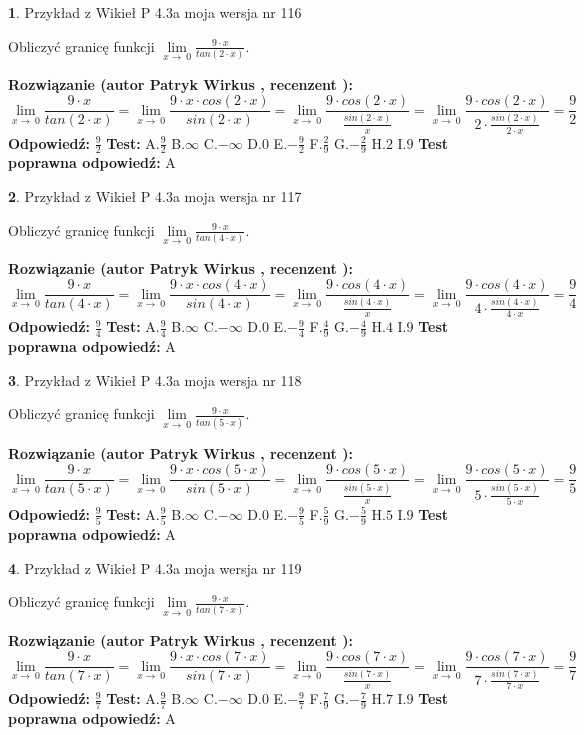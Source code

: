 \documentclass[12pt, a4paper]{article}
\theoremstyle{definition} %
\newtheorem{zad}{}
\newcommand{\zadStart}[1]{\begin{zad}#1\newline}
\newcommand{\zadStop}{\end{zad}}
\newcommand{\rozwStart}[2]{\noindent \textbf{Rozwiązanie (autor #1 , recenzent #2): }\newline}
\newcommand{\rozwStop}{\newline}
\newcommand{\odpStart}{\noindent \textbf{Odpowiedź:}\newline}
\newcommand{\odpStop}{\newline}
\newcommand{\testStart}{\noindent \textbf{Test:}\newline}
\newcommand{\testStop}{\newline}
\newcommand{\kluczStart}{\noindent \textbf{Test poprawna odpowiedź:}\newline}
\newcommand{\kluczStop}{\newline}
\begin{document}
\zadStart{Przykład z Wikieł P 4.3a moja wersja nr 116}


Obliczyć granicę funkcji $\lim\limits_{x\to\ 0}\frac{9 \cdot x}{tan(2 \cdot x)}$.
\zadStop
\rozwStart{Patryk Wirkus}{}
$$\lim\limits_{x\to\ 0}\frac{9 \cdot x}{tan(2 \cdot x)}=\lim\limits_{x\to\ 0}\frac{9 \cdot x \cdot cos(2 \cdot x)}{sin(2 \cdot x)}=\lim\limits_{x\to\ 0}\frac{9 \cdot cos(2 \cdot x)}{\frac{sin(2 \cdot x)}{x}}=\lim\limits_{x\to\ 0}\frac{9 \cdot cos(2 \cdot x)}{2 \cdot \frac{sin(2 \cdot x)}{2 \cdot x}} = \frac{9}{2}$$
\rozwStop
\odpStart
$\frac{9}{2}$
\odpStop
\testStart
A.$\frac{9}{2}$
B.$\infty$
C.$-\infty$
D.$0$
E.$-\frac{9}{2}$
F.$\frac{2}{9}$
G.$-\frac{2}{9}$
H.$2$
I.$9$
\testStop
\kluczStart
A
\kluczStop



\zadStart{Przykład z Wikieł P 4.3a moja wersja nr 117}


Obliczyć granicę funkcji $\lim\limits_{x\to\ 0}\frac{9 \cdot x}{tan(4 \cdot x)}$.
\zadStop
\rozwStart{Patryk Wirkus}{}
$$\lim\limits_{x\to\ 0}\frac{9 \cdot x}{tan(4 \cdot x)}=\lim\limits_{x\to\ 0}\frac{9 \cdot x \cdot cos(4 \cdot x)}{sin(4 \cdot x)}=\lim\limits_{x\to\ 0}\frac{9 \cdot cos(4 \cdot x)}{\frac{sin(4 \cdot x)}{x}}=\lim\limits_{x\to\ 0}\frac{9 \cdot cos(4 \cdot x)}{4 \cdot \frac{sin(4 \cdot x)}{4 \cdot x}} = \frac{9}{4}$$
\rozwStop
\odpStart
$\frac{9}{4}$
\odpStop
\testStart
A.$\frac{9}{4}$
B.$\infty$
C.$-\infty$
D.$0$
E.$-\frac{9}{4}$
F.$\frac{4}{9}$
G.$-\frac{4}{9}$
H.$4$
I.$9$
\testStop
\kluczStart
A
\kluczStop



\zadStart{Przykład z Wikieł P 4.3a moja wersja nr 118}


Obliczyć granicę funkcji $\lim\limits_{x\to\ 0}\frac{9 \cdot x}{tan(5 \cdot x)}$.
\zadStop
\rozwStart{Patryk Wirkus}{}
$$\lim\limits_{x\to\ 0}\frac{9 \cdot x}{tan(5 \cdot x)}=\lim\limits_{x\to\ 0}\frac{9 \cdot x \cdot cos(5 \cdot x)}{sin(5 \cdot x)}=\lim\limits_{x\to\ 0}\frac{9 \cdot cos(5 \cdot x)}{\frac{sin(5 \cdot x)}{x}}=\lim\limits_{x\to\ 0}\frac{9 \cdot cos(5 \cdot x)}{5 \cdot \frac{sin(5 \cdot x)}{5 \cdot x}} = \frac{9}{5}$$
\rozwStop
\odpStart
$\frac{9}{5}$
\odpStop
\testStart
A.$\frac{9}{5}$
B.$\infty$
C.$-\infty$
D.$0$
E.$-\frac{9}{5}$
F.$\frac{5}{9}$
G.$-\frac{5}{9}$
H.$5$
I.$9$
\testStop
\kluczStart
A
\kluczStop



\zadStart{Przykład z Wikieł P 4.3a moja wersja nr 119}


Obliczyć granicę funkcji $\lim\limits_{x\to\ 0}\frac{9 \cdot x}{tan(7 \cdot x)}$.
\zadStop
\rozwStart{Patryk Wirkus}{}
$$\lim\limits_{x\to\ 0}\frac{9 \cdot x}{tan(7 \cdot x)}=\lim\limits_{x\to\ 0}\frac{9 \cdot x \cdot cos(7 \cdot x)}{sin(7 \cdot x)}=\lim\limits_{x\to\ 0}\frac{9 \cdot cos(7 \cdot x)}{\frac{sin(7 \cdot x)}{x}}=\lim\limits_{x\to\ 0}\frac{9 \cdot cos(7 \cdot x)}{7 \cdot \frac{sin(7 \cdot x)}{7 \cdot x}} = \frac{9}{7}$$
\rozwStop
\odpStart
$\frac{9}{7}$
\odpStop
\testStart
A.$\frac{9}{7}$
B.$\infty$
C.$-\infty$
D.$0$
E.$-\frac{9}{7}$
F.$\frac{7}{9}$
G.$-\frac{7}{9}$
H.$7$
I.$9$
\testStop
\kluczStart
A
\kluczStop
\end{document}
